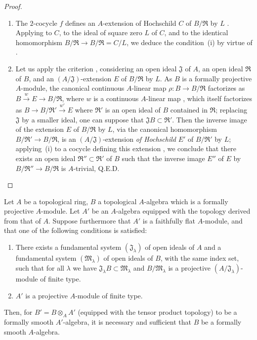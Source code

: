 \begin{proof}
\begin{enumerate}
  \item[\rm(i)] The $2$-cocycle $f$ defines an $A$-extension of Hochschild $C$ of $B/\mathfrak{R}$ by $L$ .
  Applying  to $C$, to the ideal of square zero $L$ of $C$, and to the identical homomorphism $B/\mathfrak{R}\to B/\mathfrak{R}=C/L$, we deduce the condition~(i) by virtue of .

  \item[\rm(ii)] Let us apply the criterion , considering an open ideal $\mathfrak{J}$ of $A$, an open ideal $\mathfrak{R}$ of $B$, and an $(A/\mathfrak{J})$-extension $E$ of $B/\mathfrak{R}$ by $L$.
  As $B$ is a formally projective $A$-module, the canonical continuous $A$-linear map $\rho:B\to B/\mathfrak{R}$ factorizes as $B\xrightarrow{w}E\to B/\mathfrak{R}$, where $w$ is a continuous $A$-linear map ,
  which itself factorizes as $B\to B/\mathfrak{R}'\xrightarrow{w'}E$ where $\mathfrak{R}'$ is an open ideal of $B$ contained in $\mathfrak{R}$;
  replacing $\mathfrak{J}$ by a smaller ideal, one can suppose that $\mathfrak{J}B\subset\mathfrak{R}'$.
  Then the inverse image of the extension $E$ of $B/\mathfrak{R}$ by $L$, via the canonical homomorphism $B/\mathfrak{R}'\to B/\mathfrak{R}$, is an $(A/\mathfrak{J})$-extension \emph{of Hochschild} $E'$ of $B/\mathfrak{R}'$ by $L$;
  applying~(i) to a cocycle defining this extension , we conclude that there exists an open ideal $\mathfrak{R}''\subset\mathfrak{R}'$ of $B$ such that the inverse image $E''$ of $E$ by $B/\mathfrak{R}''\to B/\mathfrak{R}$ is $A$-trivial, Q.E.D.
\end{enumerate}
\end{proof}

\begin{corollary}[19.4.6]
\label{0.19.4.6}
Let $A$ be a topological ring, $B$ a topological $A$-algebra which is a formally projective $A$-module.
Let $A'$ be an $A$-algebra equipped with the topology derived from that of $A$.
Suppose furthermore that $A'$ is a faithfully flat $A$-module, and that one of the following conditions is satisfied:
\begin{enumerate}
  \item[$1^\circ$] There exists a fundamental system $(\mathfrak{J}_\lambda)$ of open ideals of $A$ and a fundamental system $(\mathfrak{M}_\lambda)$ of open ideals of $B$, with the same index set, such that for all $\lambda$ we have $\mathfrak{J}_\lambda B\subset\mathfrak{M}_\lambda$ and $B/\mathfrak{M}_\lambda$ is a projective $(A/\mathfrak{J}_\lambda)$-module of finite type.
  \item[$2^\circ$] $A'$ is a projective $A$-module of finite type.
\end{enumerate}
Then, for $B'=B\otimes_A A'$ (equipped with the tensor product topology) to be a formally smooth $A'$-algebra, it is necessary and sufficient that $B$ be a formally smooth $A$-algebra.
\end{corollary}

